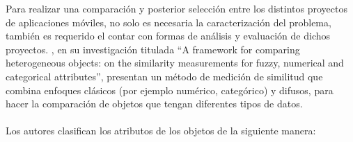 Para realizar una comparación y posterior selección entre los distintos proyectos de aplicaciones móviles, no solo es necesaria la caracterización del problema, también es requerido el contar con formas de análisis y evaluación de dichos proyectos. \citet{bashon2013framework}, en su investigación titulada “A framework for comparing heterogeneous objects: on the similarity measurements for fuzzy, numerical and categorical attributes”, presentan un método de medición de similitud que combina enfoques clásicos (por ejemplo numérico, categórico) y  difusos, para  hacer la comparación de objetos que tengan diferentes tipos de datos.\\
\\
Los autores clasifican los atributos de los objetos de la siguiente manera:\\

